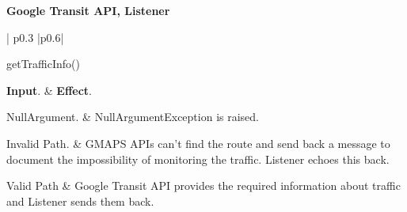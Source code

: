 	\vskip1cm

	\noindent
	\textbf{Google Transit API, Listener}\\
		\begin{tabular}{| p{} |p{}|}
			\hline
			\hline
			
			 {getTrafficInfo() }\\
			\hline
			
			\textbf{Input}.		&		\textbf{Effect}.\\
			\hline
			\hline
	
			NullArgument.	&		NullArgumentException is raised.\\
			\hline

			Invalid Path.		&		GMAPS APIs can’t find the route and send back a message to document the impossibility of monitoring the traffic. Listener echoes this back.\\
			\hline

			Valid Path & Google Transit API provides the required information about traffic and Listener sends them back.\\
			\hline
			\hline
		\end{tabular}

	\vskip1cm

